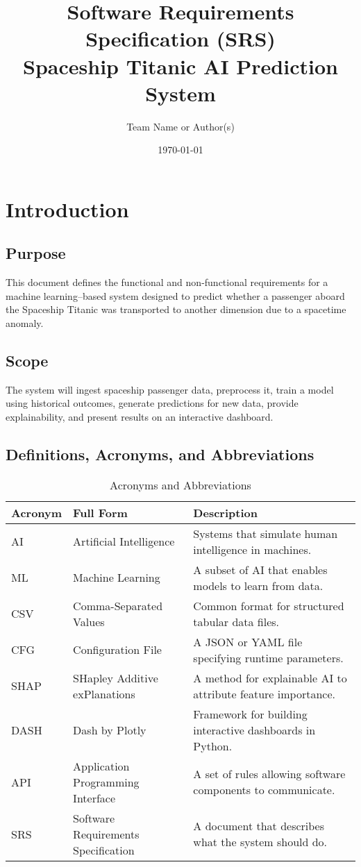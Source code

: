 \documentclass[15pt]{article}
\title{Software Requirements Specification (SRS)\\\large Spaceship Titanic AI Prediction System}
\author{Team Name or Author(s)}
\date{\today}
\begin{document}
\maketitle
\tableofcontents
\newpage

\section{Introduction}
\subsection{Purpose}
This document defines the functional and non-functional requirements for a machine learning–based system designed to predict whether a passenger aboard the Spaceship Titanic was transported to another dimension due to a spacetime anomaly.

\subsection{Scope}
The system will ingest spaceship passenger data, preprocess it, train a model using historical outcomes, generate predictions for new data, provide explainability, and present results on an interactive dashboard.

\subsection{Definitions, Acronyms, and Abbreviations}
\begin{table}[h!]
  \centering
  \begin{tabular}{|l|l|p{8cm}|}
  \hline
  \textbf{Acronym} & \textbf{Full Form}                       & \textbf{Description} \\
  \hline
  AI    & Artificial Intelligence                  & Systems that simulate human intelligence in machines. \\
  ML    & Machine Learning                         & A subset of AI that enables models to learn from data. \\
  CSV   & Comma-Separated Values                   & Common format for structured tabular data files. \\
  CFG   & Configuration File                       & A JSON or YAML file specifying runtime parameters. \\
  SHAP  & SHapley Additive exPlanations            & A method for explainable AI to attribute feature importance. \\
  DASH  & Dash by Plotly                           & Framework for building interactive dashboards in Python. \\
  API   & Application Programming Interface        & A set of rules allowing software components to communicate. \\
  SRS   & Software Requirements Specification      & A document that describes what the system should do. \\
  \hline
  \end{tabular}
  \caption{Acronyms and Abbreviations}
\end{table}
\end{document}
